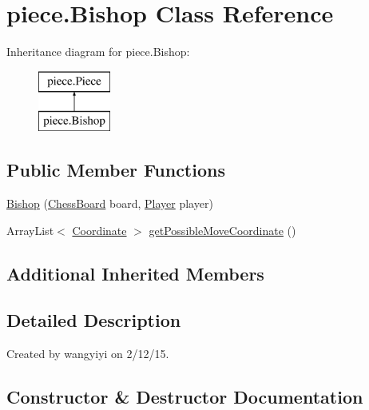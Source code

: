 \hypertarget{classpiece_1_1_bishop}{}\section{piece.\+Bishop Class Reference}
\label{classpiece_1_1_bishop}
Inheritance diagram for piece.\+Bishop\+:\begin{figure}[H]
\begin{center}
\leavevmode
\includegraphics[height=2.000000cm]{classpiece_1_1_bishop}
\end{center}
\end{figure}
\subsection*{Public Member Functions}
\begin{DoxyCompactItemize}
\item 
\hyperlink{classpiece_1_1_bishop_ac48ed9faad6e77272086e3d6bce54244}{Bishop} (\hyperlink{classchessboard_1_1_chess_board}{Chess\+Board} board, \hyperlink{enumchessboard_1_1_player}{Player} player)
\item 
Array\+List$<$ \hyperlink{classpiece_1_1_coordinate}{Coordinate} $>$ \hyperlink{classpiece_1_1_bishop_aee0c8f13e3014881bb397a48bfce4ccf}{get\+Possible\+Move\+Coordinate} ()
\end{DoxyCompactItemize}
\subsection*{Additional Inherited Members}


\subsection{Detailed Description}
Created by wangyiyi on 2/12/15. 

\subsection{Constructor \& Destructor Documentation}
\hypertarget{classpiece_1_1_bishop_ac48ed9faad6e77272086e3d6bce54244}{}

